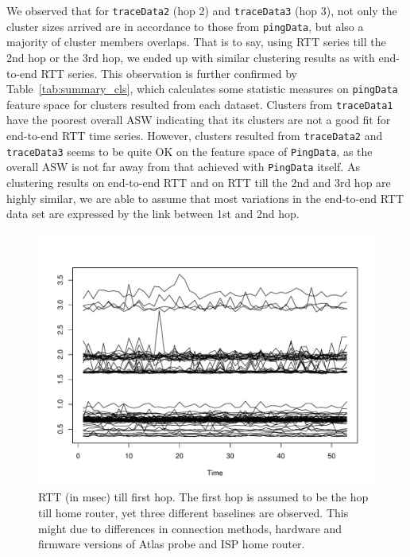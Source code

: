 We observed that for \texttt{traceData2} (hop 2) and \texttt{traceData3} (hop 3), not only the cluster sizes arrived are in accordance to those from \texttt{pingData}, but also a majority of cluster members overlaps. 
That is to say, using RTT series till the 2nd hop or the 3rd hop, we ended up with similar clustering results as with end-to-end RTT series. 
This observation is further confirmed by Table~\ref{tab:summary_cls}, which calculates some statistic measures on \texttt{pingData} feature space for clusters resulted from each dataset. 
Clusters from \texttt{traceData1} have the poorest overall \ac{ASW} indicating that its clusters are not a good fit for end-to-end RTT time series. 
However, clusters resulted from \texttt{traceData2} and \texttt{traceData3} seems to be quite OK on the feature space of \texttt{PingData}, as the overall \ac{ASW} is not far away from that achieved with \texttt{PingData} itself.
As clustering results on end-to-end RTT and on RTT till the 
2nd and 3rd hop are highly similar, we are able to assume that most variations in the end-to-end RTT data set are expressed by the link between 1st and 2nd hop.

\begin{figure}[!htb]
\centering
\includegraphics[width=\textwidth]{gfx/chap3/trace1_cls2_traceRTT.pdf}
\caption{RTT (in msec) till first hop. The first hop is assumed to be the hop till home router, yet three different baselines are observed. This might due to differences in connection methods, hardware and firmware versions of Atlas probe and ISP home router.}
\label{fig:trace1_traceRTT}
\end{figure}

